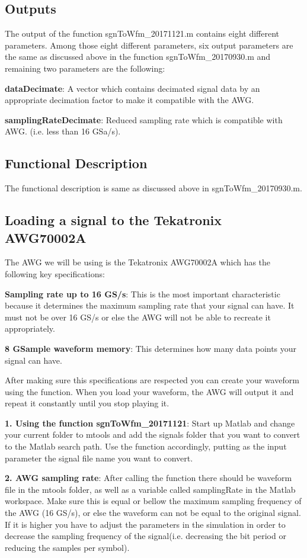 \subsection*{Outputs}
The output of the function sgnToWfm\_20171121.m contains eight different parameters. Among those eight different parameters, six output parameters are the same as discussed above in the function sgnToWfm\_20170930.m and remaining two parameters are the following:
\bigskip

\textbf{dataDecimate}: A vector which contains decimated signal data by an appropriate decimation factor to make it compatible with the AWG.
\bigskip	

\textbf{samplingRateDecimate}: Reduced sampling rate which is compatible with AWG. (i.e. less than 16 GSa/s).

\subsection*{Functional Description}
The functional description is same as discussed above in sgnToWfm\_20170930.m.

\subsection{Loading a signal to the Tekatronix AWG70002A}

The AWG we will be using is the Tekatronix AWG70002A which has the following key specifications:
\bigskip

\textbf{Sampling rate up to 16 GS/s}: This is the most important characteristic  because it determines the maximum sampling rate that your signal can have. It must not be over 16 GS/s or else the AWG will not be able to recreate it appropriately.
\bigskip

\textbf{8 GSample waveform memory}: This determines how many data points your signal can have.
\bigskip

After making sure this specifications are respected you can create your waveform using the function. When you load your waveform, the AWG will output it and repeat it constantly until you stop playing it.
\bigskip

\textbf{1. Using the function sgnToWfm\_20171121}:
Start up Matlab and change your current folder to mtools and add the signals folder that you want to convert to the Matlab search path. Use the function accordingly, putting as the input parameter the signal file name you want to convert.
\bigskip

\noindent
\textbf{2. AWG sampling rate}:
After calling the function there should be waveform file in the mtools folder, as well as a variable called samplingRate in the Matlab workspace. Make sure this is equal or bellow the maximum sampling frequency of the AWG (16 GS/s), or else the waveform can not be equal to the original signal. If it is higher you  have to adjust the parameters in the simulation in order to decrease the sampling frequency of the signal(i.e. decreasing the bit period or reducing the samples per symbol).
\bigskip

